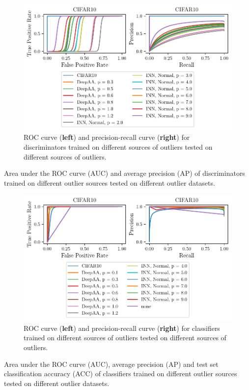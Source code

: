 \begin{figure}[htpb]
    \centering
    \includegraphics{figures/samples/ferg_CIFAR10_curve_disc.pdf}
    \caption{ROC curve (\textbf{left}) and precision-recall curve (\textbf{right}) for
        discriminators trained on different sources of outliers tested on
        different sources of outliers.}%
    \label{fig:ferg_stat_disc}
\end{figure}

\begin{table}[htpb]
	\centering
        \caption{Area under the ROC curve (AUC) and average precision (AP) of
        discriminators trained on different outlier sources tested on different
        outlier datasets.}%
	\label{tab:ferg_disc}
	
\end{table}

\begin{figure}[htpb]
    \centering
    \includegraphics{figures/samples/ferg_CIFAR10_curve_class.pdf}
    \caption{ROC curve (\textbf{left}) and precision-recall curve (\textbf{right}) for
        classifiers trained on different sources of outliers tested on
        different sources of outliers.}%
    \label{fig:ferg_stat_class}
\end{figure}

\begin{table}[htpb]
	\centering
        \caption{Area under the ROC curve (AUC), average precision (AP) and
        test set classification accuracy (ACC) of classifiers trained on
        different outlier sources tested on different outlier datasets.}%
	\label{tab:ferg_class}
	
\end{table}

